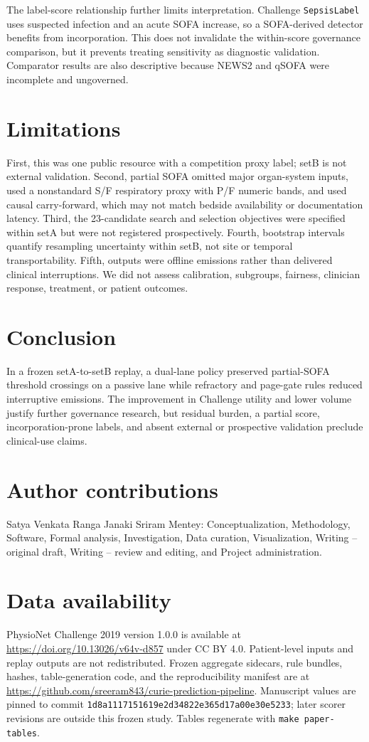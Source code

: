 \documentclass[11pt]{article}
\begin{document}
The label-score relationship further limits interpretation. Challenge
\texttt{SepsisLabel} uses suspected infection and an acute SOFA increase, so a
SOFA-derived detector benefits from incorporation.\citep{reyna2020ccm} This
does not invalidate the within-score governance comparison, but it prevents
treating sensitivity as diagnostic validation. Comparator results are also
descriptive because NEWS2 and qSOFA were incomplete and ungoverned.

\section{Limitations}
First, this was one public resource with a competition proxy label; setB is not
external validation. Second, partial SOFA omitted major organ-system inputs,
used a nonstandard S/F respiratory proxy with P/F numeric bands, and used
causal carry-forward, which may not match bedside availability or
documentation latency. Third, the 23-candidate search and selection objectives
were specified within setA but were not registered prospectively. Fourth,
bootstrap intervals quantify resampling uncertainty within setB, not site or
temporal transportability. Fifth, outputs were offline emissions rather than
delivered clinical interruptions. We did not assess calibration, subgroups,
fairness, clinician response, treatment, or patient outcomes.

\section{Conclusion}
In a frozen setA-to-setB replay, a dual-lane policy preserved partial-SOFA
threshold crossings on a passive lane while refractory and page-gate rules
reduced interruptive emissions. The improvement in Challenge utility and lower
volume justify further governance research, but residual burden, a partial
score, incorporation-prone labels, and absent external or prospective
validation preclude clinical-use claims.

\section*{Author contributions}
Satya Venkata Ranga Janaki Sriram Mentey: Conceptualization, Methodology,
Software, Formal analysis, Investigation, Data curation, Visualization, Writing
-- original draft, Writing -- review and editing, and Project administration.

\section*{Data availability}
PhysioNet Challenge 2019 version 1.0.0 is available at
\url{https://doi.org/10.13026/v64v-d857} under CC BY 4.0. Patient-level inputs
and replay outputs are not redistributed. Frozen aggregate sidecars, rule
bundles, hashes, table-generation code, and the reproducibility manifest are at
\url{https://github.com/sreeram843/curie-prediction-pipeline}. Manuscript values
are pinned to commit \texttt{1d8a1117151619e2d34822e365d17a00e30e5233}; later
scorer revisions are outside this frozen study. Tables regenerate with
\texttt{make paper-tables}.
\end{document}
